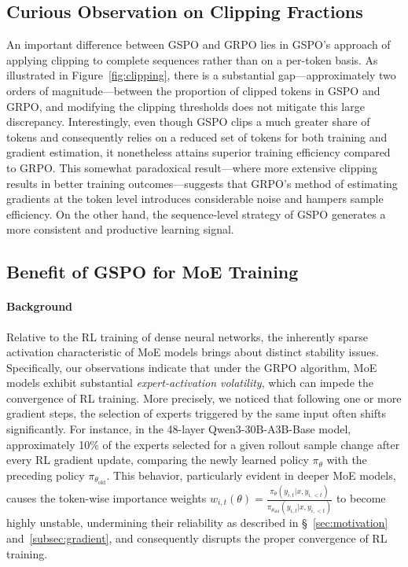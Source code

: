 \subsection{Curious Observation on Clipping Fractions}

An important difference between GSPO and GRPO lies in GSPO's approach of applying clipping to complete sequences rather than on a per-token basis. As illustrated in Figure~\ref{fig:clipping}, there is a substantial gap—approximately two orders of magnitude—between the proportion of clipped tokens in GSPO and GRPO, and modifying the clipping thresholds does not mitigate this large discrepancy. Interestingly, even though GSPO clips a much greater share of tokens and consequently relies on a reduced set of tokens for both training and gradient estimation, it nonetheless attains superior training efficiency compared to GRPO. This somewhat paradoxical result—where more extensive clipping results in better training outcomes—suggests that GRPO’s method of estimating gradients at the token level introduces considerable noise and hampers sample efficiency. On the other hand, the sequence-level strategy of GSPO generates a more consistent and productive learning signal.

\subsection{Benefit of GSPO for MoE Training}
\label{subsec:routing_replay}

\paragraph{Background}
Relative to the RL training of dense neural networks, the inherently sparse activation characteristic of MoE models brings about distinct stability issues. Specifically, our observations indicate that under the GRPO algorithm, MoE models exhibit substantial \textit{expert-activation volatility}, which can impede the convergence of RL training. More precisely, we noticed that following one or more gradient steps, the selection of experts triggered by the same input often shifts significantly. For instance, in the 48-layer Qwen3-30B-A3B-Base model, approximately 10\% of the experts selected for a given rollout sample change after every RL gradient update, comparing the newly learned policy $\pi_{\theta}$ with the preceding policy $\pi_{\theta_\text{old}}$. This behavior, particularly evident in deeper MoE models, causes the token-wise importance weights $w_{i,t}(\theta) = \frac{ \pi_{\theta} (y_{i,t} | x, y_{i,<t}) }{ \pi_{\theta_\text{old}} (y_{i,t} | x,y_{i,<t})}$ to become highly unstable, undermining their reliability as described in \S~\ref{sec:motivation} and~\ref{subsec:gradient}, and consequently disrupts the proper convergence of RL training.

